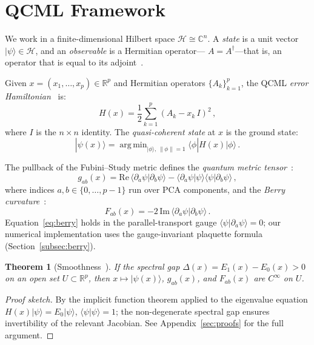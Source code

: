 \documentclass[3p]{elsarticle}
\newtheorem{theorem}{Theorem}
\newcommand{\ket}[1]{|#1\rangle}
\newcommand{\braket}[2]{\langle#1|#2\rangle}
\newcommand{\dbraket}[3]{\langle#1|#2|#3\rangle}
\newcommand{\R}{\mathbb{R}}
\newcommand{\C}{\mathbb{C}}
\newcommand{\calH}{\mathcal{H}}
\DeclareMathOperator*{\argmin}{arg\,min}
\begin{document}
\section{QCML Framework}\label{sec:framework}

We work in a finite-dimensional Hilbert space $\calH \cong \C^n$.  A
\emph{state} is a unit vector $\ket{\psi} \in \calH$, and an
\emph{observable} is a Hermitian operator---
$A = A^\dagger$---that is, an operator that is equal to its adjoint~\cite{candelori2025,abanov2025}.

Given $x = (x_1, \ldots, x_p) \in \R^p$ and Hermitian operators
$\{A_k\}_{k=1}^p$, the QCML \emph{error
Hamiltonian}~\cite{candelori2025,musaelian2024} is:
\begin{equation}\label{eq:hamiltonian}
  H(x) = \frac{1}{2}\sum_{k=1}^{p} (A_k - x_k\, I)^2\,,
\end{equation}
where $I$ is the $n \times n$ identity.  The \emph{quasi-coherent
state} at $x$ is the ground state:
\begin{equation}\label{eq:ground_state}
  \ket{\psi(x)} = \argmin_{\ket{\phi},\,\|\phi\|=1}
  \dbraket{\phi}{H(x)}{\phi}\,.
\end{equation}

The pullback of the Fubini--Study metric defines the \emph{quantum
metric tensor}~\cite{provost_vallee1980}:
\begin{equation}\label{eq:metric}
  g_{ab}(x) = \mathrm{Re}\,\braket{\partial_a\psi}{\partial_b\psi}
  - \braket{\partial_a\psi}{\psi}\braket{\psi}{\partial_b\psi}\,,
\end{equation}
where indices $a, b \in \{0, \ldots, p-1\}$ run over PCA components,
and the \emph{Berry curvature}~\cite{berry1984,abanov2025}:
\begin{equation}\label{eq:berry}
  F_{ab}(x) = -2\,\mathrm{Im}\,\braket{\partial_a\psi}{\partial_b\psi}\,.
\end{equation}
Equation~\eqref{eq:berry} holds in the parallel-transport gauge
$\braket{\psi}{\partial_a\psi} = 0$; our numerical implementation uses
the gauge-invariant plaquette formula (Section~\ref{subsec:berry}).

\begin{theorem}[Smoothness~\cite{candelori2025}]\label{thm:smoothness}
If the spectral gap $\Delta(x) = E_1(x) - E_0(x) > 0$ on an open set
$U \subset \R^p$, then $x \mapsto \ket{\psi(x)}$, $g_{ab}(x)$, and
$F_{ab}(x)$ are $C^\infty$ on $U$.
\end{theorem}
\begin{proof}[Proof sketch]
By the implicit function theorem applied to the eigenvalue equation
$H(x)\ket{\psi} = E_0\ket{\psi}$, $\braket{\psi}{\psi} = 1$;
the non-degenerate spectral gap ensures invertibility of the
relevant Jacobian.  See Appendix~\ref{sec:proofs} for the full argument.
\end{proof}
\end{document}
